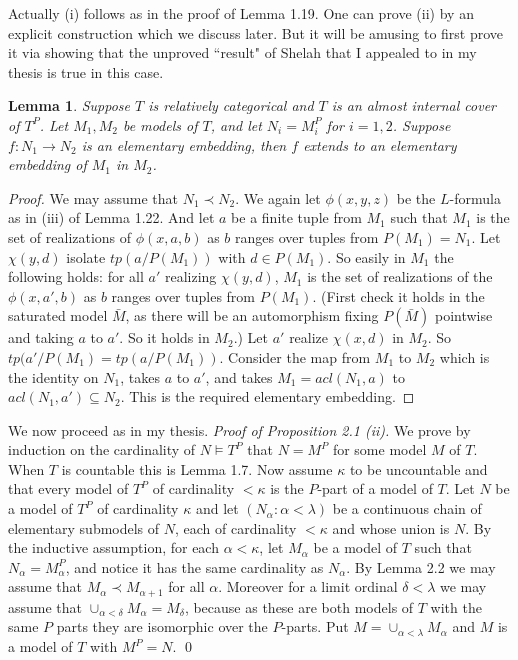 \documentclass[12pt]{article}
\newtheorem{Lemma}[Theorem]{Lemma}
\begin{document}
Actually (i) follows as in the proof of Lemma 1.19.   One can prove (ii) by an explicit construction which we discuss later. But it will be amusing to first prove it via showing that the unproved ``result" of Shelah that I appealed to in my thesis is true in this case. 

\begin{Lemma} Suppose $T$ is relatively  categorical and $T$ is an almost internal cover of $T^{P}$. Let $M_{1}, M_{2}$ be models of $T$, and let $N_{i} = M_{i}^{P}$ for $i=1,2$. Suppose $f:N_{1}\to N_{2}$ is an elementary embedding, then $f$ extends to an elementary embedding of $M_{1}$ in $M_{2}$. 
\end{Lemma} 
\begin{proof} We may assume that $N_{1}\prec N_{2}$. We again let $\phi(x,y,z)$ be the $L$-formula as in (iii) of Lemma 1.22.  And let $a$ be a finite tuple from $M_{1}$ such that $M_{1}$ is the set of realizations of
$\phi(x,a,b)$ as $b$ ranges over tuples from $P(M_{1}) = N_{1}$.  Let $\chi(y,d)$ isolate $tp(a/P(M_{1}))$ with $d\in P(M_{1})$.  So easily in $M_{1}$ the following holds: for all $a'$ realizing $\chi(y,d)$, $M_{1}$ is the set of realizations of the $\phi(x,a',b)$ as $b$ ranges over tuples from $P(M_{1})$.  (First check it holds in the saturated model ${\bar M}$, as there will be an automorphism fixing $P({\bar M})$ pointwise and taking $a$ to $a'$.  
So it holds in $M_{2}$.)  Let $a'$ realize $\chi(x,d)$ in $M_{2}$.  So $tp(a'/P(M_{1}) = tp(a/P(M_{1}))$.  Consider the map from $M_{1}$ to $M_{2}$ which is the identity on $N_{1}$, takes $a$ to $a'$, and takes  $M_{1} = acl(N_{1},a)$ to $acl(N_{1},a')\subseteq N_{2}$.  This is the required  elementary embedding. 

\end{proof}


\noindent
We now  proceed as in my thesis. 
\newline
{\em Proof of Proposition 2.1 (ii).} 
 We prove by induction on the cardinality of $N\models T^{P}$ that $N = M^{P}$ for some model $M$ of $T$.
When $T$ is countable this is Lemma 1.7.
Now assume $\kappa$ to be uncountable and that every model of $T^{P}$ of cardinality $<\kappa$ is the $P$-part of a model of $T$.
Let $N$ be a model of $T^{P}$ of cardinality $\kappa$ and let $(N_{\alpha}: \alpha < \lambda)$ be a continuous chain of elementary submodels of $N$, each of cardinality $< \kappa$ and whose union is $N$.
By the inductive assumption, for each $\alpha < \kappa$, let $M_{\alpha}$ be a model of $T$ such that $N_{\alpha} = M_{\alpha}^{P}$, and notice it has the same cardinality as $N_{\alpha}$. 
By Lemma 2.2 we may assume that $M_{\alpha}\prec M_{\alpha + 1}$ for all $\alpha$.
Moreover for a limit ordinal $\delta < \lambda$ we may assume that $\cup_{\alpha<\delta}M_{\alpha} = M_{\delta}$,  because as these are both models of $T$ with the same $P$ parts they are isomorphic over the $P$-parts.
Put $M = \cup_{\alpha< \lambda}M_{\alpha}$ and $M$ is a model of $T$ with $M^{P} = N$.   \qed
\end{document}

